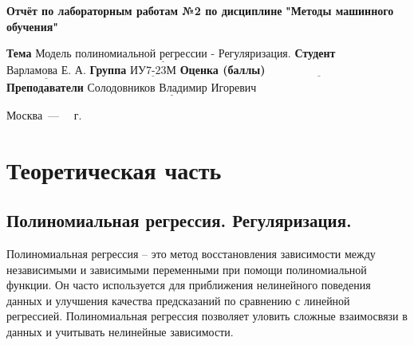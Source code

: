 \documentclass[12pt]{report}
\begin{document}
\begin{titlepage}
	
	\begin{center}
		\noindent\begin{minipage}{1.3\textwidth}\centering
			\Large\textbf{  Отчёт по лабораторным работам №2 по дисциплине}\newline
			\textbf{ "Методы машинного обучения"}\newline\newline
		\end{minipage}
	\end{center}
	
	\noindent\textbf{Тема} $\underline{\text{Модель полиномиальной регрессии - Регуляризация.}}$\newline\newline
	\noindent\textbf{Студент} $\underline{\text{Варламова Е. А.}}$\newline\newline
	\noindent\textbf{Группа} $\underline{\text{ИУ7-23М}}$\newline\newline
	\noindent\textbf{Оценка (баллы)} $\underline{\text{~~~~~~~~~~~~~~~~~~~~~~~~~~~}}$\newline\newline
	\noindent\textbf{Преподаватели} $\underline{\text{Солодовников Владимир Игоревич}}$\newline\newline\newline
	
	\begin{center}
		\vfill
		Москва~---~\the\year
		~г.
	\end{center}
\end{titlepage}
\large
\setcounter{page}{2}
\def\contentsname{СОДЕРЖАНИЕ}
\renewcommand{\contentsname}{СОДЕРЖАНИЕ}
\tableofcontents
\renewcommand\labelitemi{---}
\newpage
\chapter{Теоретическая часть}
\section{Полиномиальная регрессия. Регуляризация.}

Полиномиальная регрессия -- это метод восстановления зависимости между независимыми и зависимыми переменными при помощи полиномиальной функции. Он часто используется для приближения нелинейного поведения данных и улучшения качества предсказаний по сравнению с линейной регрессией. Полиномиальная регрессия позволяет уловить сложные взаимосвязи в данных и учитывать нелинейные зависимости.
\end{document}
